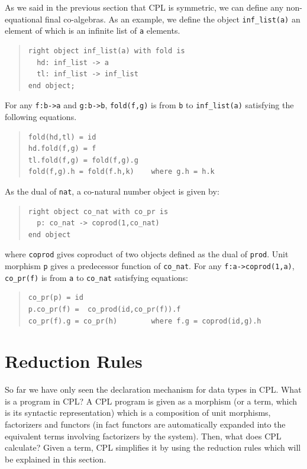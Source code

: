 As we said in the previous section that CPL is symmetric, we can define any
non-equational final co-algebras.  As an example, we define the object
 \verb"inf_list(a)" an element of which is an infinite list of \verb"a"
elements.
\begin{quote}
\begin{verbatim}
right object inf_list(a) with fold is
  hd: inf_list -> a
  tl: inf_list -> inf_list
end object;
\end{verbatim}
\end{quote}
For any \verb"f:b->a" and \verb"g:b->b", \verb"fold(f,g)" is from \verb"b"
to \verb"inf_list(a)" satisfying the following equations.
\begin{quote}
\begin{verbatim}
fold(hd,tl) = id
hd.fold(f,g) = f
tl.fold(f,g) = fold(f,g).g
fold(f,g).h = fold(f.h,k)    where g.h = h.k
\end{verbatim}
\end{quote}

As the dual of \verb"nat", a co-natural number object is given by:
\begin{quote}
\begin{verbatim}
right object co_nat with co_pr is
  p: co_nat -> coprod(1,co_nat)
end object
\end{verbatim}
\end{quote}
where \verb"coprod" gives coproduct of two objects defined as the dual of
 \verb"prod".  Unit morphism \verb"p" gives a predecessor function of
 \verb"co_nat".  For any \verb"f:a->coprod(1,a)", \verb"co_pr(f)" is from
 \verb"a" to \verb"co_nat" satisfying equations:
\begin{quote}
\begin{verbatim}
co_pr(p) = id
p.co_pr(f) =  co_prod(id,co_pr(f)).f
co_pr(f).g = co_pr(h)        where f.g = coprod(id,g).h
\end{verbatim}
\end{quote}


\section{Reduction Rules}

So far we have only seen the declaration mechanism for data types in CPL.
What is a program in CPL?  A CPL program is given as a morphism (or a term,
which is its syntactic representation) which is a composition of unit
morphisms, factorizers and functors (in fact functors are automatically
expanded into the equivalent terms involving factorizers by the system).
Then, what does CPL calculate?  Given a term, CPL simplifies it by using the
reduction rules which will be explained in this section.

